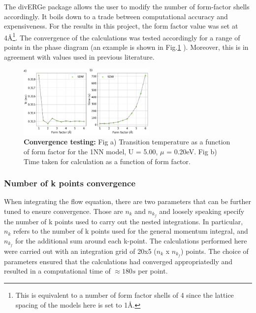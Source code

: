 \documentclass[12pt]{article}
\begin{document}
\medskip


\noindent The divERGe package allows the user to modify the number of form-factor shells accordingly. It boils down to a trade 
between computational accuracy and expensiveness. 
For the results in this project, the form factor value was set at 4\AA\footnote{This is equivalent to a number of form factor shells of 4 since the lattice spacing of the models here is set to 1\AA.}. The convergence of 
the calculations was tested accordingly for a range of points in the phase diagram (an example is shown in Fig.\ref{fig:Formfactorconvergence} ). Moreover, this is in agreement with values used in previous literature\cite{lichtenstein2018functional}. 

\begin{figure}[htbp]  %
    \centering
    \includegraphics[width=0.6\textwidth]{convergence.png}  %
    \caption{\textbf{Convergence testing:} Fig a) Transition temperature as a function of form factor for the 1NN model, U = 5.00, $\mu$ = 0.20eV. Fig b) Time taken for calculation
    as a function of form factor.   }
    \label{fig:Formfactorconvergence}
\end{figure}







\subsubsection{Number of k points convergence }

When integrating the flow equation, there are two parameters that can be further tuned to ensure convergence.
Those are $n_k$ and $n_{k_f}$ and  loosely speaking specify the number of k points used to carry out the nested integrations. 
In particular, $n_k$ refers to the number of k points used for the general momentum integral, and $n_{k_f}$ for 
the additional sum around each k-point. The calculations performed here were carried out with an integration 
grid of 20x5 ($n_k$ x $n_{k_f}$) points. The choice of parameters ensured that the calculations had converged appropriatedly 
and resulted in a computational time of $\approx 180s$ per point. 
\end{document}
